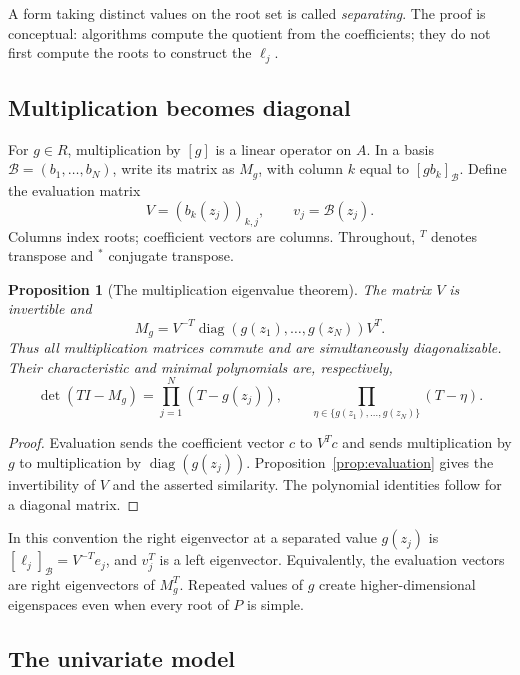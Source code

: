 \documentclass[12pt]{article}
\def\B{\mathcal{B}}
\DeclareMathOperator{\diag}{diag}
\newtheorem{proposition}[theorem]{Proposition}
\theoremstyle{definition}
\theoremstyle{remark}
\begin{document}
A form taking distinct values on the root set is called \emph{separating}.
The proof is conceptual: algorithms compute the quotient from the coefficients;
they do not first compute the roots to construct the $\ell_j$.

\subsection{Multiplication becomes diagonal}\label{sec:multiplication}

For $g\in R$, multiplication by $[g]$ is a linear operator on $A$. In a basis
$\B=(b_1,\ldots,b_N)$, write its matrix as $M_g$, with column $k$ equal to
$[gb_k]_\B$. Define the evaluation matrix
\[
  V=(b_k(z_j))_{k,j},\qquad v_j=\B(z_j).
\]
Columns index roots; coefficient vectors are columns. Throughout, ${}^T$ denotes
transpose and ${}^*$ conjugate transpose.

\begin{proposition}[The multiplication eigenvalue theorem]\label{prop:multiplication}
The matrix $V$ is invertible and
\begin{equation}\label{eq:stickelberger}
  M_g=V^{-T}\diag(g(z_1),\ldots,g(z_N))V^T.
\end{equation}
Thus all multiplication matrices commute and are simultaneously diagonalizable.
Their characteristic and minimal polynomials are, respectively,
\[
  \det(TI-M_g)=\prod_{j=1}^N(T-g(z_j)),\qquad
  \prod_{\eta\in\{g(z_1),\ldots,g(z_N)\}}(T-\eta).
\]
\end{proposition}

\begin{proof}
Evaluation sends the coefficient vector $c$ to $V^Tc$ and sends multiplication by $g$
to multiplication by $\diag(g(z_j))$. Proposition~\ref{prop:evaluation} gives the
invertibility of $V$ and the asserted similarity. The polynomial identities follow
for a diagonal matrix.
\end{proof}

In this convention the right eigenvector at a separated value $g(z_j)$ is
$[\ell_j]_\B=V^{-T}e_j$, and $v_j^T$ is a left eigenvector. Equivalently,
the evaluation vectors are right eigenvectors of $M_g^T$. Repeated values of $g$
create higher-dimensional eigenspaces even when every root of $P$ is simple.

\subsection{The univariate model}\label{sec:companion}
\end{document}
